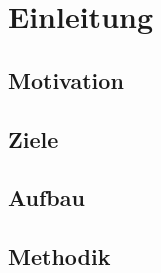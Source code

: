 \newpage
\section{Einleitung}

\subsection{Motivation} \label{ssec:motivation}

\subsection{Ziele}

\subsection{Aufbau}


\subsection{Methodik} \label{ssec:methodik}


